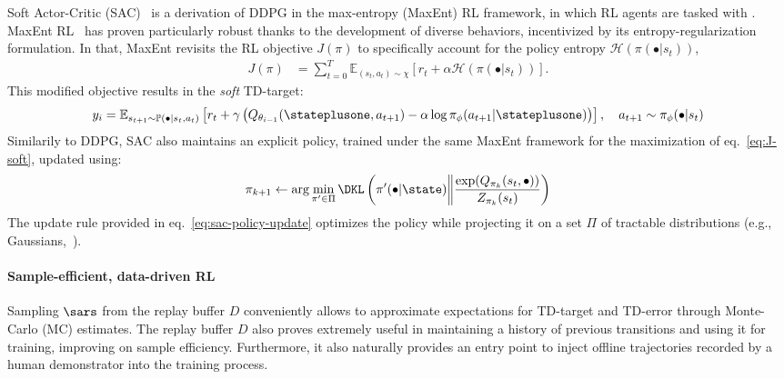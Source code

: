 Soft Actor-Critic (SAC)~\citep{haarnojaSoftActorCriticOffPolicy2018} is a derivation of DDPG in the max-entropy (MaxEnt) RL framework, in which RL agents are tasked with .
MaxEnt RL~\citep{haarnojaReinforcementLearningDeep2017} has proven particularly robust thanks to the development of diverse behaviors, incentivized by its entropy-regularization formulation.
In that, MaxEnt revisits the RL objective \( J (\pi) \) to specifically account for the policy entropy \( \mathcal H(\pi (\bullet \vert s_t)) \),
\begin{align}
    J(\pi) &= \sum_{t=0}^T \mathbb{E}_{(s_t, a_t) \sim \chi} \left[ r_t + \alpha \mathcal H(\pi (\bullet \vert s_t)) \right].
    \label{eq:J-soft}
\end{align}
This modified objective results in the \emph{soft} TD-target:
\begin{equation}\label{eq:soft-td-target}
    y_i = \mathbb E_{s_{t+1} \sim \mathbb P( \bullet \vert s_t, a_t)} \left[ r_t + \gamma \left( Q_{\theta_{i-1}} (\stateplusone, a_{t+1}) - \alpha \log \pi_\phi(a_{t+1} \vert \stateplusone) \right) \right], \quad a_{t+1} \sim \pi_\phi(\bullet \vert s_t)
\end{equation}
Similarily to DDPG, SAC also maintains an explicit policy, trained under the same MaxEnt framework for the maximization of eq.~\ref{eq:J-soft}, updated using:
\begin{equation}\label{eq:sac-policy-update}
    \pi_{k+1} \leftarrow \arg\min_{\pi^\prime \in \Pi} \DKL \left(\pi^\prime (\bullet \vert \state) \bigg\Vert \frac{\exp(Q_{\pi_k}(s_t, \bullet))}{Z_{\pi_k}(s_t)} \right)
\end{equation}
The update rule provided in eq.~\ref{eq:sac-policy-update} optimizes the policy while projecting it on a set \( \Pi \) of tractable distributions (e.g., Gaussians,~\citet{haarnojaReinforcementLearningDeep2017}).

\paragraph{Sample-efficient, data-driven RL}
Sampling \( \sars \) from the replay buffer \( D \) conveniently allows to approximate expectations for TD-target and TD-error through Monte-Carlo (MC) estimates.
The replay buffer \( D \) also proves extremely useful in maintaining a history of previous transitions and using it for training, improving on sample efficiency.
Furthermore, it also naturally provides an entry point to inject offline trajectories recorded by a human demonstrator into the training process.

